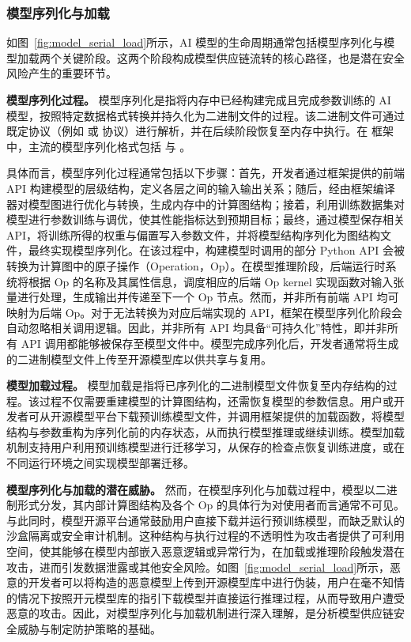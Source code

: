 \subsubsection{模型序列化与加载}
如图~\ref{fig:model_serial_load}所示，AI 模型的生命周期通常包括模型序列化与模型加载两个关键阶段。这两个阶段构成模型供应链流转的核心路径，也是潜在安全风险产生的重要环节。

\textbf{模型序列化过程。}
模型序列化是指将内存中已经构建完成且完成参数训练的 AI 模型，按照特定数据格式转换并持久化为二进制文件的过程。该二进制文件可通过既定协议（例如  或 协议）进行解析，并在后续阶段恢复至内存中执行。在  框架中，主流的模型序列化格式包括  与 。

具体而言，模型序列化过程通常包括以下步骤：首先，开发者通过框架提供的前端 API 构建模型的层级结构，定义各层之间的输入输出关系；随后，经由框架编译器对模型图进行优化与转换，生成内存中的计算图结构；接着，利用训练数据集对模型进行参数训练与调优，使其性能指标达到预期目标；最终，通过模型保存相关 API，将训练所得的权重与偏置写入参数文件，并将模型结构序列化为图结构文件，最终实现模型序列化。在该过程中，构建模型时调用的部分 Python API 会被转换为计算图中的原子操作（Operation，Op）。在模型推理阶段，后端运行时系统将根据 Op 的名称及其属性信息，调度相应的后端 Op kernel 实现函数对输入张量进行处理，生成输出并传递至下一个 Op 节点。然而，并非所有前端 API 均可映射为后端 Op。对于无法转换为对应后端实现的 API，框架在模型序列化阶段会自动忽略相关调用逻辑。因此，并非所有 API 均具备“可持久化”特性，即并非所有 API 调用都能够被保存至模型文件中。模型完成序列化后，开发者通常将生成的二进制模型文件上传至开源模型库以供共享与复用。

\textbf{模型加载过程。}
模型加载是指将已序列化的二进制模型文件恢复至内存结构的过程。该过程不仅需要重建模型的计算图结构，还需恢复模型的参数信息。用户或开发者可从开源模型平台下载预训练模型文件，并调用框架提供的加载函数，将模型结构与参数重构为序列化前的内存状态，从而执行模型推理或继续训练。模型加载机制支持用户利用预训练模型进行迁移学习，从保存的检查点恢复训练进度，或在不同运行环境之间实现模型部署迁移。

\textbf{模型序列化与加载的潜在威胁。}
然而，在模型序列化与加载过程中，模型以二进制形式分发，其内部计算图结构及各个 Op 的具体行为对使用者而言通常不可见。与此同时，模型开源平台通常鼓励用户直接下载并运行预训练模型，而缺乏默认的沙盒隔离或安全审计机制。这种结构与执行过程的不透明性为攻击者提供了可利用空间，使其能够在模型内部嵌入恶意逻辑或异常行为，在加载或推理阶段触发潜在攻击，进而引发数据泄露或其他安全风险。如图~\ref{fig:model_serial_load}所示，恶意的开发者可以将构造的恶意模型上传到开源模型库中进行伪装，用户在毫不知情的情况下按照开元模型库的指引下载模型并直接运行推理过程，从而导致用户遭受恶意的攻击。因此，对模型序列化与加载机制进行深入理解，是分析模型供应链安全威胁与制定防护策略的基础。

